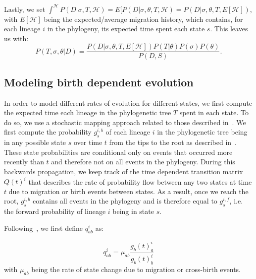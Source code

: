 \documentclass[12pt]{elife_based}
\begin{document}
Lastly, we set $\int^{\mathcal{H}}P(D|\sigma,T,\mathcal{H})=E[P(D|\sigma,\theta,T,\mathcal{H})=P(D|\sigma,\theta,T,E[\mathcal{H}])$, with $E[\mathcal{H}]$ being the expected/average migration history, which contains, for each lineage $i$ in the phylogeny, its expected time spent each state $s$.
This leaves us with:
\begin{equation}
     P(T,\sigma,\theta|D)=\frac{P(D|\sigma,\theta,T,E[\mathcal{H}])P(T|\theta)P(\sigma)P(\theta)}{P(D,S)} .
     \label{posterioreq}
 \end{equation}

\subsection*{Modeling birth dependent evolution}
In order to model different rates of evolution for different states, we first compute the expected time each lineage in the phylogenetic tree $T$ spent in each state. 
To do so, we use a stochastic mapping approach related to those described in~\cite{nielsen2002mapping,huelsenbeck2003stochastic}.
We first compute the probability $g^{i,b}_s$ of each lineage $i$ in the phylogenetic tree being in any possible state $s$ over time $t$ from the tips to the root as described in~\cite{Kuhnert:2016vv}. 
These state probabilities are conditional only on events that occurred more recently than $t$ and therefore not on all events in the phylogeny.
During this backwards propagation, we keep track of the time dependent transition matrix $Q(t)^i$ that describes the rate of probability flow between any two states at time $t$ due to migration or birth events between states. 
As a result, once we reach the root, $g^{i,b}_s$ contains all events in the phylogeny and is therefore equal to $g^{i,f}_s$, i.e. the forward probability of lineage $i$ being in state $s$. 

Following~\citet{stolz2022joint}, we first define $q^i_{ab}$ as:

\begin{equation*}
q^i_{ab} =  \mu_{ab}\frac{g_b(t)^i_a}{g_b(t)^i_b}
\end{equation*}
with $\mu_{ab}$ being the rate of state change due to migration or cross-birth events.
\end{document}
